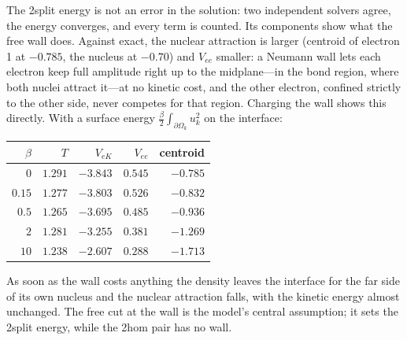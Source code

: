 \documentclass[11pt]{article}
\begin{document}
The 2split energy is not an error in the solution: two independent solvers agree, the energy
converges, and every term is counted. Its components show what the free wall does. Against exact,
the nuclear attraction is larger (centroid of electron 1 at $-0.785$, the nucleus at $-0.70$) and
$V_{ee}$ smaller: a Neumann wall lets each electron keep full amplitude right up to the
midplane---in the bond region, where both nuclei attract it---at no kinetic cost, and the other
electron, confined strictly to the other side, never competes for that region. Charging the wall
shows this directly. With a surface energy $\tfrac{\beta}{2}\int_{\partial\Omega_k} u_k^2$ on the
interface:
\begin{center}
\small
\begin{tabular}{rrrrr}
\toprule
$\beta$ & $T$ & $V_{eK}$ & $V_{ee}$ & centroid \\
\midrule
$0$    & $1.291$ & $-3.843$ & $0.545$ & $-0.785$ \\
$0.15$ & $1.277$ & $-3.803$ & $0.526$ & $-0.832$ \\
$0.5$  & $1.265$ & $-3.695$ & $0.485$ & $-0.936$ \\
$2$    & $1.281$ & $-3.255$ & $0.381$ & $-1.269$ \\
$10$   & $1.238$ & $-2.607$ & $0.288$ & $-1.713$ \\
\bottomrule
\end{tabular}
\end{center}
As soon as the wall costs anything the density leaves the interface for the far side of its own
nucleus and the nuclear attraction falls, with the kinetic energy almost unchanged. The free cut at
the wall is the model's central assumption; it sets the 2split energy, while the 2hom pair has no
wall.

\end{document}
